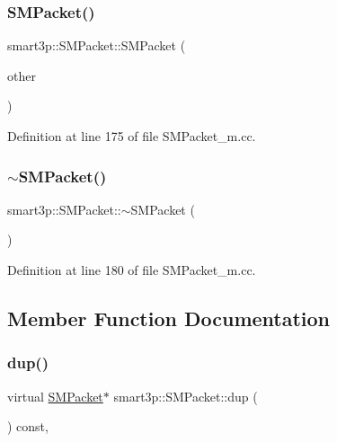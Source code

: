 \subsubsection{\texorpdfstring{S\+M\+Packet()}{SMPacket()}\hspace{0.1cm}{\footnotesize\ttfamily [2/2]}}
{\footnotesize\ttfamily smart3p\+::\+S\+M\+Packet\+::\+S\+M\+Packet (\begin{DoxyParamCaption}\item[{const \hyperlink{classsmart3p_1_1SMPacket}{S\+M\+Packet} \&}]{other }\end{DoxyParamCaption})}



Definition at line 175 of file S\+M\+Packet\+\_\+m.\+cc.

\mbox{\label{classsmart3p_1_1SMPacket_ab5e176e11c65abb458f17f75ccad4344}} 
\subsubsection{\texorpdfstring{$\sim$\+S\+M\+Packet()}{~SMPacket()}}
{\footnotesize\ttfamily smart3p\+::\+S\+M\+Packet\+::$\sim$\+S\+M\+Packet (\begin{DoxyParamCaption}{ }\end{DoxyParamCaption})\hspace{0.3cm}{\ttfamily [virtual]}}



Definition at line 180 of file S\+M\+Packet\+\_\+m.\+cc.



\subsection{Member Function Documentation}
\mbox{\label{classsmart3p_1_1SMPacket_a94d4fe6ad55564e56212f96d9b65e346}} 
\subsubsection{\texorpdfstring{dup()}{dup()}}
{\footnotesize\ttfamily virtual \hyperlink{classsmart3p_1_1SMPacket}{S\+M\+Packet}$\ast$ smart3p\+::\+S\+M\+Packet\+::dup (\begin{DoxyParamCaption}{ }\end{DoxyParamCaption}) const\hspace{0.3cm}{\ttfamily [inline]}, {\ttfamily [virtual]}}



